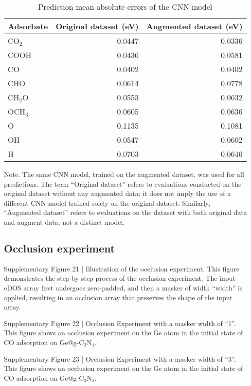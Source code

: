 \begin{table}[h]
  \centering
  \begin{tabular}{lrr}
    \hline
    \textbf{Adsorbate} & \textbf{Original dataset (eV)} & \textbf{Augmented dataset (eV)} \\
    \hline
    CO$_2$  & 0.0447 & 0.0336 \\
    COOH    & 0.0436 & 0.0581 \\
    CO      & 0.0402 & 0.0402 \\
    CHO     & 0.0614 & 0.0778 \\
    CH$_2$O & 0.0553 & 0.0632 \\
    OCH$_3$ & 0.0605 & 0.0636 \\
    O       & 0.1135 & 0.1081 \\
    OH      & 0.0547 & 0.0602 \\
    H       & 0.0703 & 0.0646 \\
    \hline
  \end{tabular}
  \caption{Prediction mean absolute errors of the CNN model}
  \label{si_table18}
\end{table}

Note. The same CNN model, trained on the augmented dataset, was used for all predictions. The term “Original dataset” refers to evaluations conducted on the original dataset without any augmented data; it does not imply the use of a different CNN model trained solely on the original dataset. Similarly, “Augmented dataset” refers to evaluations on the dataset with both original data and augment data, not a distinct model.

\subsection{Occlusion experiment}

Supplementary Figure 21 | Illustration of the occlusion experiment. This figure demonstrates the step-by-step process of the occlusion experiment. The input eDOS array first undergoes zero-padded, and then a masker of width “width” is applied, resulting in an occlusion array that preserves the shape of the input array.


Supplementary Figure 22 | Occlusion Experiment with a masker width of “1”. This figure shows an occlusion experiment on the Ge atom in the initial state of CO adsorption on Ge@g-C$_3$N$_4$.


Supplementary Figure 23 | Occlusion Experiment with a masker width of “3”. This figure shows an occlusion experiment on the Ge atom in the initial state of CO adsorption on Ge@g-C$_3$N$_4$.


